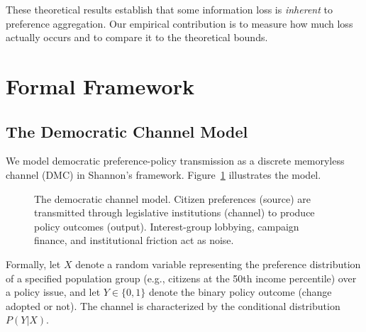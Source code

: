 \documentclass[twocolumn,10pt]{article}
\begin{document}
These theoretical results establish that some information loss is \emph{inherent} to preference aggregation.  Our empirical contribution is to measure how much loss actually occurs and to compare it to the theoretical bounds.

\section{Formal Framework}
\label{sec:framework}

\subsection{The Democratic Channel Model}

We model democratic preference-policy transmission as a discrete memoryless channel (DMC) in Shannon's framework.  Figure~\ref{fig:channel} illustrates the model.

\begin{figure}[t]
\centering
{}
\caption{The democratic channel model.  Citizen preferences (source) are transmitted through legislative institutions (channel) to produce policy outcomes (output).  Interest-group lobbying, campaign finance, and institutional friction act as noise.}
\label{fig:channel}
\end{figure}

Formally, let $X$ denote a random variable representing the preference distribution of a specified population group (e.g., citizens at the 50th income percentile) over a policy issue, and let $Y \in \{0, 1\}$ denote the binary policy outcome (change adopted or not).  The channel is characterized by the conditional distribution $P(Y|X)$.
\end{document}
